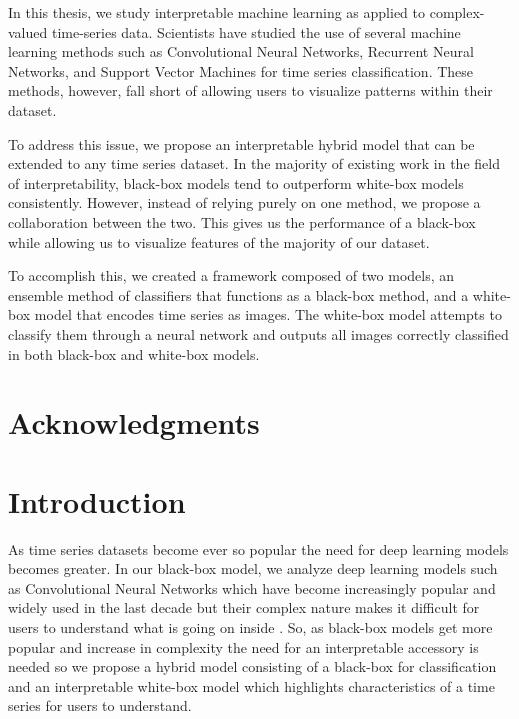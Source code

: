 \documentclass{turabian-thesis}
\begin{document}

In this thesis, we study interpretable machine learning as applied to complex-valued time-series data. Scientists have studied the use of several machine learning methods such as Convolutional Neural Networks, Recurrent Neural Networks, and Support Vector Machines for time series classification. These methods, however, fall short of allowing users to visualize patterns within their dataset.

To address this issue, we propose an interpretable hybrid model that can be extended to any time series dataset. In the majority of existing work in the field of interpretability, black-box models tend to outperform white-box models consistently. However, instead of relying purely on one method, we propose a collaboration between the two. This gives us the performance of a black-box while allowing us to visualize features of the majority of our dataset. 

To accomplish this, we created a framework composed of two models, an ensemble method of classifiers that functions as a black-box method, and a white-box model that encodes time series as images. The white-box model attempts to classify them through a neural network and outputs all images correctly classified in both black-box and white-box models.

\chapter{Acknowledgments}

\tableofcontents
\listofillustrations

\mainmatter
\chapter{Introduction}
\label{chap:introduction}

As time series datasets become ever so popular the need for deep learning models becomes greater.
In our black-box model, we analyze deep learning models such as Convolutional Neural Networks which have become increasingly popular and widely used in the last decade but their complex nature makes it difficult for users to understand what is going on inside \cite{wang_hybrid_2019}. So, as black-box models get more popular and increase in complexity the need for an interpretable accessory is needed so we propose a hybrid model consisting of a black-box for classification and an interpretable white-box model which highlights characteristics of a time series for users to understand.
\end{document}
